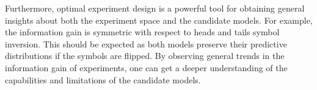 \documentclass{article}
\begin{document}
Furthermore, optimal experiment design is a powerful tool for obtaining general insights about both the experiment space and the candidate models. For example, the information gain is symmetric with respect to heads and tails symbol inversion. This should be expected as both models preserve their predictive distributions if the symbols are flipped. By observing general trends in the information gain of experiments, one can get a deeper understanding of the capabilities and limitations of the candidate models.

\end{document}
